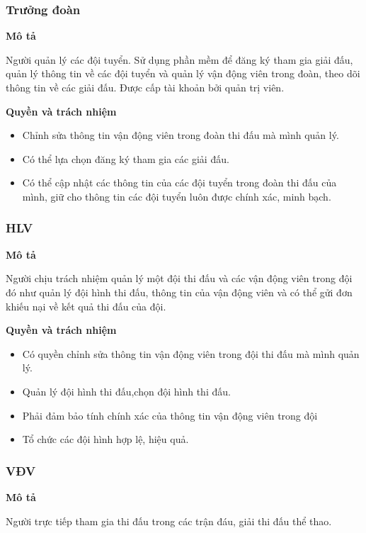 \subsubsection{Trưởng đoàn}
\noindent
\textbf{Mô tả}

Người quản lý các đội tuyển. Sử dụng phần mềm để đăng ký tham gia giải đấu,
quản lý thông tin về các đội tuyển và quản lý vận động viên trong đoàn,
theo dõi thông tin về các giải đấu. Được cấp tài khoản bởi quản trị viên.

\noindent
\textbf{Quyền và trách nhiệm}
\begin{itemize}[leftmargin=1.5cm, label={\textbf{--}}]
  \item Chỉnh sửa thông tin vận động viên trong đoàn thi đấu mà mình quản lý.
  \item Có thể lựa chọn đăng ký tham gia các giải đấu.
  \item Có thể cập nhật các thông tin của các đội tuyển trong đoàn thi đấu của mình, giữ cho thông tin các đội tuyển luôn được chính xác, minh bạch.
\end{itemize}

\subsubsection{HLV}
\noindent
\textbf{Mô tả}

Người chịu trách nhiệm quản lý một đội thi đấu và các vận động viên trong đội đó
như quản lý đội hình thi đấu, thông tin của vận động viên và
có thể gửi đơn khiếu nại về kết quả thi đấu của đội.

\noindent
\textbf{Quyền và trách nhiệm}
\begin{itemize}[leftmargin=1.5cm, label={\textbf{--}}]
  \item Có quyền chỉnh sửa thông tin vận động viên trong đội thi đấu mà mình quản lý.
  \item Quản lý đội hình thi đấu,chọn đội hình thi đấu.
  \item Phải đảm bảo tính chính xác của thông tin vận động viên trong đội
  \item Tổ chức các đội hình hợp lệ, hiệu quả.
\end{itemize}


\subsubsection{VĐV}
\noindent
\textbf{Mô tả}

Người trực tiếp tham gia thi đấu trong các trận đáu, giải thi đấu thể thao.

